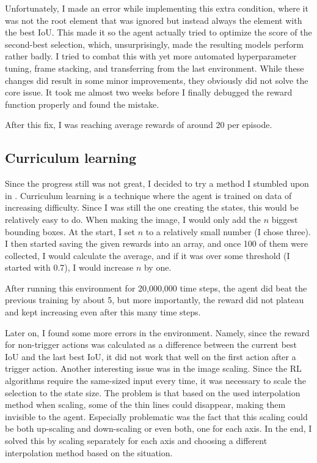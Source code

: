 \documentclass[
  digital,     %
  oneside,     %
  nosansbold,  %
  nocolorbold, %
  lof,         %
  lot,         %
]{fithesis4}
\begin{document}
Unfortunately, I made an error while implementing this extra condition, where it was not the root element that was ignored but instead always the element with the best IoU. This made it so the agent actually tried to optimize the score of the second-best selection, which, unsurprisingly, made the resulting models perform rather badly. I tried to combat this with yet more automated hyperparameter tuning, frame stacking, and transferring from the last environment. While these changes did result in some minor improvements, they obviously did not solve the core issue. It took me almost two weeks before I finally debugged the reward function properly and found the mistake.

After this fix, I was reaching average rewards of around 20 per episode.

\subsection{Curriculum learning}

Since the progress still was not great, I decided to try a method I stumbled upon in \cite{GDRL}. Curriculum learning is a technique where the agent is trained on data of increasing difficulty. Since I was still the one creating the states, this would be relatively easy to do. When making the image, I would only add the $n$ biggest bounding boxes. At the start, I set $n$ to a relatively small number (I chose three). I then started saving the given rewards into an array, and once 100 of them were collected, I would calculate the average, and if it was over some threshold (I started with 0.7), I would increase $n$ by one.

After running this environment for 20,000,000 time steps, the agent did beat the previous training by about 5, but more importantly, the reward did not plateau and kept increasing even after this many time steps.

Later on, I found some more errors in the environment. Namely, since the reward for non-trigger actions was calculated as a difference between the current best IoU and the last best IoU, it did not work that well on the first action after a trigger action.
Another interesting issue was in the image scaling. Since the RL algorithms require the same-sized input every time, it was necessary to scale the selection to the state size. The problem is that based on the used interpolation method when scaling, some of the thin lines could disappear, making them invisible to the agent. Especially problematic was the fact that this scaling could be both up-scaling and down-scaling or even both, one for each axis. In the end, I solved this by scaling separately for each axis and choosing a different interpolation method based on the situation.
\end{document}
